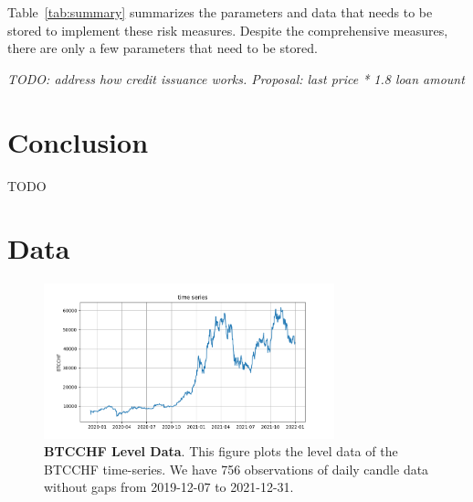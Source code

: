 \documentclass[english,11pt]{article}
\begin{document}
Table~\ref{tab:summary} summarizes the parameters and data that needs to be
stored to implement these risk measures. Despite the comprehensive
measures, there are only a few parameters that need to be stored.

\emph{TODO: address how credit issuance works. Proposal: last price * 1.8 loan amount}
\clearpage
\section{Conclusion}
TODO

\newpage



\clearpage
\appendix
\section{Data}\label{appx:data}
\begin{figure}[h]
    \center
    \includegraphics[width=0.75\textwidth]{time_series.png}
    \caption{\textbf{BTCCHF Level Data}. This figure plots
    the level data of the BTCCHF time-series. 
    We have 756 observations of daily candle data without gaps from 2019-12-07 to
    2021-12-31.}\label{fig:timeseries}
\end{figure}
\end{document}
